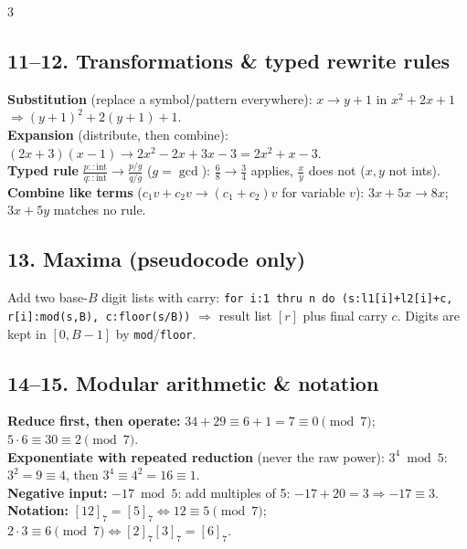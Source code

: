 \documentclass[9pt]{extarticle}
\begin{document}
\begin{multicols}{3}
\subsection{11--12. Transformations \& typed rewrite rules}
\begin{sloppypar}\raggedright
\textbf{Substitution} (replace a symbol/pattern everywhere): $x\to y{+}1$ in $x^2{+}2x{+}1$ $\Rightarrow(y{+}1)^2{+}2(y{+}1){+}1$.\\
\textbf{Expansion} (distribute, then combine): $(2x{+}3)(x{-}1)\to2x^2{-}2x{+}3x{-}3{=}2x^2{+}x{-}3$.\\
\textbf{Typed rule} $\frac{p::\mathrm{int}}{q::\mathrm{int}}\to\frac{p/g}{q/g}$ ($g{=}\gcd$): $\frac{6}{8}\to\frac34$ applies, $\frac{x}{y}$ does not ($x,y$ not ints).\\
\textbf{Combine like terms} ($c_1v{+}c_2v\to(c_1{+}c_2)v$ for variable $v$): $3x{+}5x\to8x$; $3x{+}5y$ matches no rule.
\end{sloppypar}

\subsection{13. Maxima (pseudocode only)}
\begin{sloppypar}\raggedright
Add two base-$B$ digit lists with carry: \texttt{for i:1 thru n do (s:l1[i]+l2[i]+c, r[i]:mod(s,B), c:floor(s/B))} $\Rightarrow$ result list $[r]$ plus final carry $c$. Digits are kept in $[0,B{-}1]$ by \texttt{mod}/\texttt{floor}.
\end{sloppypar}

\subsection{14--15. Modular arithmetic \& notation}
\begin{sloppypar}\raggedright
\textbf{Reduce first, then operate:} $34{+}29\equiv6{+}1{=}7\equiv0\pmod7$; $5{\cdot}6\equiv30\equiv2\pmod7$.\\
\textbf{Exponentiate with repeated reduction} (never the raw power): $3^4\bmod5$: $3^2{=}9\equiv4$, then $3^4\equiv4^2{=}16\equiv1$.\\
\textbf{Negative input:} $-17\bmod5$: add multiples of 5: $-17{+}20{=}3\Rightarrow-17\equiv3$.\\
\textbf{Notation:} $[12]_7{=}[5]_7\iff12\equiv5\pmod7$; $2{\cdot}3\equiv6\pmod7\iff[2]_7[3]_7{=}[6]_7$.
\end{sloppypar}


\end{multicols}
\end{document}
